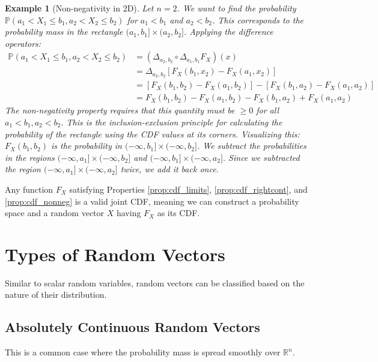 \documentclass[11pt]{article}
\newtheorem{example}[theorem]{Example}
\theoremstyle{definition} %
\newcommand{\R}{\mathbb{R}} %
\renewcommand{\P}{\mathbb{P}} %
\begin{document}
\begin{example}[Non-negativity in 2D] \label{ex:2d_cdf_prob}
Let $n=2$. We want to find the probability $\P(a_1 < X_1 \le b_1, a_2 < X_2 \le b_2)$ for $a_1 < b_1$ and $a_2 < b_2$. This corresponds to the probability mass in the rectangle $(a_1, b_1] \times (a_2, b_2]$. Applying the difference operators:
\begin{align*} \P(a_1 < X_1 \le b_1, a_2 < X_2 \le b_2) &= (\Delta_{a_2, b_2} \circ \Delta_{a_1, b_1} F_X)(x) \\ &= \Delta_{a_2, b_2} [ F_X(b_1, x_2) - F_X(a_1, x_2) ] \\ &= [ F_X(b_1, b_2) - F_X(a_1, b_2) ] - [ F_X(b_1, a_2) - F_X(a_1, a_2) ] \\ &= F_X(b_1, b_2) - F_X(a_1, b_2) - F_X(b_1, a_2) + F_X(a_1, a_2)\end{align*}
The non-negativity property requires that this quantity must be $\ge 0$ for all $a_1 < b_1, a_2 < b_2$. This is the inclusion-exclusion principle for calculating the probability of the rectangle using the CDF values at its corners. Visualizing this: $F_X(b_1, b_2)$ is the probability in $(-\infty, b_1] \times (-\infty, b_2]$. We subtract the probabilities in the regions $(-\infty, a_1] \times (-\infty, b_2]$ and $(-\infty, b_1] \times (-\infty, a_2]$. Since we subtracted the region $(-\infty, a_1] \times (-\infty, a_2]$ twice, we add it back once.
\end{example}

Any function $F_X$ satisfying Properties \ref{prop:cdf_limits}, \ref{prop:cdf_rightcont}, and \ref{prop:cdf_nonneg} is a valid joint CDF, meaning we can construct a probability space and a random vector $X$ having $F_X$ as its CDF.

\section{Types of Random Vectors}

Similar to scalar random variables, random vectors can be classified based on the nature of their distribution.

\subsection{Absolutely Continuous Random Vectors}

This is a common case where the probability mass is spread smoothly over $\R^n$.
\end{document}
